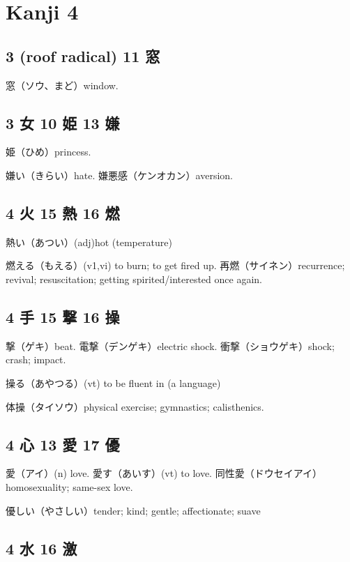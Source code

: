 \chapter{Kanji 4}

\section{3 (roof radical) 11 窓}

窓（ソウ、まど）window.

\section{3 女 10 姫 13 嫌}

姫（ひめ）princess.

嫌い（きらい）hate.
嫌悪感（ケンオカン）aversion.

\section{4 火 15 熱 16 燃}

熱い（あつい）(adj)hot (temperature)

燃える（もえる）(v1,vi) to burn; to get fired up.
再燃（サイネン）recurrence; revival; resuscitation;
getting spirited/interested once again.

\section{4 手 15 撃 16 操}

撃（ゲキ）beat.
電撃（デンゲキ）electric shock.
衝撃（ショウゲキ）shock; crash; impact.

操る（あやつる）(vt) to be fluent in (a language)

体操（タイソウ）physical exercise; gymnastics; calisthenics.

\section{4 心 13 愛 17 優}

愛（アイ）(n) love.
愛す（あいす）(vt) to love.
同性愛（ドウセイアイ）homosexuality; same-sex love.

優しい（やさしい）tender; kind; gentle; affectionate; suave

\section{4 水 16 激}


